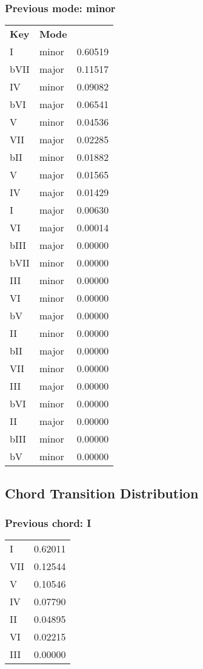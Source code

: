 \subsubsection*{Previous mode: minor}

\begin{tabular}{l l l}
\textbf{Key} & \textbf{Mode} \\
I & minor & 0.60519 \\
bVII & major & 0.11517 \\
IV & minor & 0.09082 \\
bVI & major & 0.06541 \\
V & minor & 0.04536 \\
VII & major & 0.02285 \\
bII & minor & 0.01882 \\
V & major & 0.01565 \\
IV & major & 0.01429 \\
I & major & 0.00630 \\
VI & major & 0.00014 \\
bIII & major & 0.00000 \\
bVII & minor & 0.00000 \\
III & minor & 0.00000 \\
VI & minor & 0.00000 \\
bV & major & 0.00000 \\
II & minor & 0.00000 \\
bII & major & 0.00000 \\
VII & minor & 0.00000 \\
III & major & 0.00000 \\
bVI & minor & 0.00000 \\
II & major & 0.00000 \\
bIII & minor & 0.00000 \\
bV & minor & 0.00000 \\
\end{tabular}

\subsection{Chord Transition Distribution}


\subsubsection*{Previous chord: I}


\begin{tabular}{l l}
I & 0.62011 \\
VII & 0.12544 \\
V & 0.10546 \\
IV & 0.07790 \\
II & 0.04895 \\
VI & 0.02215 \\
III & 0.00000 \\
\end{tabular}


